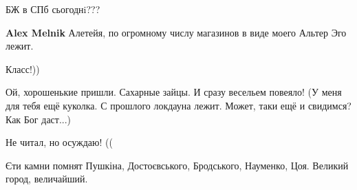\begin{itemize}
БЖ в СПб сьогоднi???

\begin{itemize} %
\textbf{Alex Melnik} Алетейя, по огромному числу магазинов в виде моего Альтер Эго лежит.
\end{itemize} %

Класс!))


Ой, хорошенькие пришли. Сахарные зайцы. И сразу весельем повеяло! (У меня для
тебя ещё куколка. С прошлого локдауна лежит. Может, таки ещё и свидимся? Как
Бог даст...)

Не читал, но осуждаю! ((

Єти камни помнят Пушкіна, Достоєвського, Бродського, Науменко, Цоя. Великий город, величайший.

\end{itemize} %

